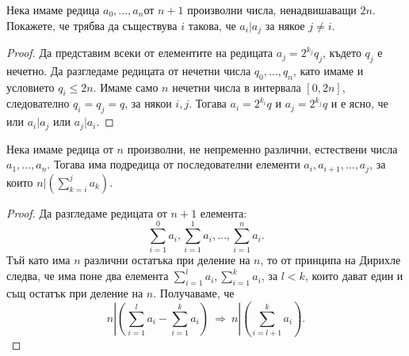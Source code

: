 \begin{problem}%
  Нека имаме редица $a_0,\dots,a_n$от $n+1$ произволни числа, ненадвишаващи $2n$.
  Покажете, че трябва да съществува $i$ такова, че $a_i\vert a_j$ за някое $j\neq i$.
\end{problem}
\begin{proof}
  Да представим всеки от елементите на редицата $a_j = 2^{k_j}q_j$, където $q_j$ е нечетно.
  Да разгледаме редицата от нечетни числа $q_0,\dots,q_n$, като имаме и условието $q_i \leq 2n$.
  Имаме само $n$ нечетни числа в интервала $[0,2n]$, следователно $q_i = q_j = q$, за някои $i,j$.
  Тогава $a_i = 2^{k_i}q$ и $a_j = 2^{k_j}q$ и е ясно, че или $a_i\vert a_j$ или $a_j\vert a_i$.  
\end{proof}



\begin{problem}
  Нека имаме редица от $n$ произволни, не непременно различни, естествени числа $a_1,\dots,a_n$.
  Тогава има подредица от последователни елементи $a_i,a_{i+1},\dots,a_{j}$, за които
  $n | (\sum^{j}_{k=i}a_k)$.
\end{problem}
\begin{proof}
  Да разгледаме редицата от $n+1$ елемента:
  \[\sum^0_{i=1}a_i,\sum^1_{i=1}a_i,\dots,\sum^n_{i=1}a_i.\]
  Тъй като има $n$ различни остатъка при деление на $n$, то от принципа на Дирихле следва, че 
  има поне два елемента $\sum^l_{i=1}a_i, \sum^k_{i=1}a_i$, за $l<k$, които дават един и същ остатък при деление на $n$.
  Получаваме, че \[n|(\sum^l_{i=1}a_i - \sum^k_{i=1}a_i)\ \Rightarrow\ n|(\sum^k_{i=l+1}a_i).\]
\end{proof}

